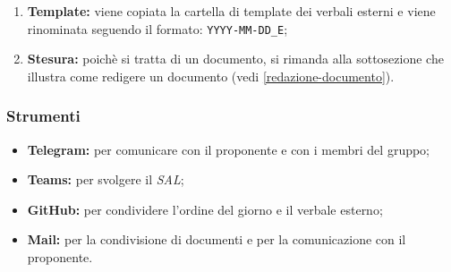 \begin{itemize}
\begin{enumerate}
		      \item \textbf{Template:} viene copiata la cartella di template dei
		            verbali esterni e viene rinominata seguendo il formato:
		            \texttt{YYYY-MM-DD\_E};

		      \item \textbf{Stesura:} poichè si tratta di un documento, si
		            rimanda alla sottosezione che illustra come redigere un
		            documento (vedi \autoref{redazione-documento}).
	      \end{enumerate}
\end{itemize}

\subsubsection{Strumenti}
\begin{itemize}
	\item \textbf{Telegram\g:} per comunicare con il proponente e con i membri del
	      gruppo;

	\item \textbf{Teams:} per svolgere il \textit{SAL};

	\item \textbf{GitHub\g:} per condividere l'ordine del giorno e il verbale
	      esterno;

	\item \textbf{Mail:} per la condivisione di documenti e per la
	      comunicazione con il proponente.
\end{itemize}
